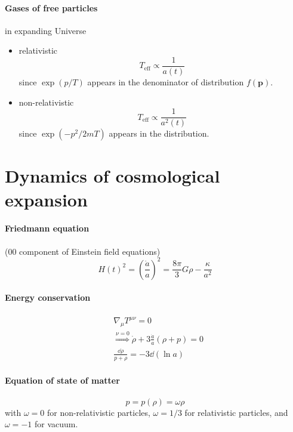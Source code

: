 \documentclass[12pt, a4paper, DIV=15]{article}
\numberwithin{equation}{section}
\newcommand{\eff}{\text{eff}}
\begin{document}
\paragraph{Gases of free particles} in expanding Universe
\begin{itemize}
   \item relativistic
      \begin{equation}
         T_\eff \propto \frac{1}{a(t)}
      \end{equation}
      since $\exp(p/T)$ appears in the denominator of distribution $f(\pmb{p})$.
   \item non-relativistic
      \begin{equation}
         T_\eff \propto \frac{1}{a^2(t)}
      \end{equation}
      since $\exp(-p^2/2mT)$ appears in the distribution.
\end{itemize}

\section{Dynamics of cosmological expansion}
\paragraph{Friedmann equation} ($00$ component of Einstein field equations)
\begin{equation}
   H(t)^2 = \left ( \frac{\dot{a}}{a} \right)^2  = \frac{8\pi}{3} G \rho - \frac{\kappa}{a^2}
   \label{Friedmann}
\end{equation}

\paragraph{Energy conservation}
\begin{align}
   &\nabla_\mu T^{\mu \nu} = 0 \\
   &\stackrel{\nu=0}{\Rightarrow} \dot{\rho} + 3 \frac{\dot{a}}{a} (\rho + p) = 0 \\
   & \frac{\dd{\rho}}{p + \rho} = -3 \dd{(\ln a)} \label{Econs}
\end{align}

\paragraph{Equation of state of matter}
\begin{equation}
   p = p(\rho) = \omega \rho
\end{equation}
with $\omega = 0$ for non-relativistic particles, $\omega=1/3$ for relativistic particles, and $\omega = -1$ for vacuum.
\end{document}
